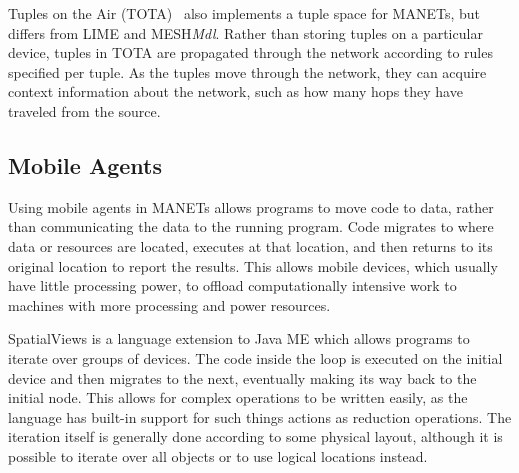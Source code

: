 Tuples on the Air (TOTA)~\cite{tota} also implements a tuple space for MANETs, but differs from LIME and MESH\textit{Mdl}. Rather than storing tuples on a particular device, tuples in TOTA are propagated through the network according to rules specified per tuple. As the tuples move through the network, they can acquire context information about the network, such as how many hops they have traveled from the source.

\subsection{Mobile Agents}

Using mobile agents in MANETs allows programs to move code to data, rather than communicating the data to the running program. Code migrates to where data or resources are located, executes at that location, and then returns to its original location to report the results. This allows mobile devices, which usually have little processing power, to offload computationally intensive work to machines with more processing and power resources.

SpatialViews\cite{sv} is a language extension to Java ME which allows programs to iterate over groups of devices. The code inside the loop is executed on the initial device and then migrates to the next, eventually making its way back to the initial node. This allows for complex operations to be written easily, as the language has built-in support for such things actions as reduction operations. The iteration itself is generally done according to some physical layout, although it is possible to iterate over all objects or to use logical locations instead.
